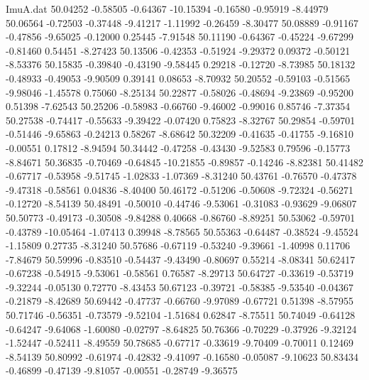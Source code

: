 \begin{filecontents}{ImuA.dat}
  50.04252   -0.58505   -0.64367  -10.15394   -0.16580   -0.95919   -8.44979
  50.06564   -0.72503   -0.37448   -9.41217   -1.11992   -0.26459   -8.30477
  50.08889   -0.91167   -0.47856   -9.65025   -0.12000    0.25445   -7.91548
  50.11190   -0.64367   -0.45224   -9.67299   -0.81460    0.54451   -8.27423
  50.13506   -0.42353   -0.51924   -9.29372    0.09372   -0.50121   -8.53376
  50.15835   -0.39840   -0.43190   -9.58445    0.29218   -0.12720   -8.73985
  50.18132   -0.48933   -0.49053   -9.90509    0.39141    0.08653   -8.70932
  50.20552   -0.59103   -0.51565   -9.98046   -1.45578    0.75060   -8.25134
  50.22877   -0.58026   -0.48694   -9.23869   -0.95200    0.51398   -7.62543
  50.25206   -0.58983   -0.66760   -9.46002   -0.99016    0.85746   -7.37354
  50.27538   -0.74417   -0.55633   -9.39422   -0.07420    0.75823   -8.32767
  50.29854   -0.59701   -0.51446   -9.65863   -0.24213    0.58267   -8.68642
  50.32209   -0.41635   -0.41755   -9.16810   -0.00551    0.17812   -8.94594
  50.34442   -0.47258   -0.43430   -9.52583    0.79596   -0.15773   -8.84671
  50.36835   -0.70469   -0.64845  -10.21855   -0.89857   -0.14246   -8.82381
  50.41482   -0.67717   -0.53958   -9.51745   -1.02833   -1.07369   -8.31240
  50.43761   -0.76570   -0.47378   -9.47318   -0.58561    0.04836   -8.40400
  50.46172   -0.51206   -0.50608   -9.72324   -0.56271   -0.12720   -8.54139
  50.48491   -0.50010   -0.44746   -9.53061   -0.31083   -0.93629   -9.06807
  50.50773   -0.49173   -0.30508   -9.84288    0.40668   -0.86760   -8.89251
  50.53062   -0.59701   -0.43789  -10.05464   -1.07413    0.39948   -8.78565
  50.55363   -0.64487   -0.38524   -9.45524   -1.15809    0.27735   -8.31240
  50.57686   -0.67119   -0.53240   -9.39661   -1.40998    0.11706   -7.84679
  50.59996   -0.83510   -0.54437   -9.43490   -0.80697    0.55214   -8.08341
  50.62417   -0.67238   -0.54915   -9.53061   -0.58561    0.76587   -8.29713
  50.64727   -0.33619   -0.53719   -9.32244   -0.05130    0.72770   -8.43453
  50.67123   -0.39721   -0.58385   -9.53540   -0.04367   -0.21879   -8.42689
  50.69442   -0.47737   -0.66760   -9.97089   -0.67721    0.51398   -8.57955
  50.71746   -0.56351   -0.73579   -9.52104   -1.51684    0.62847   -8.75511
  50.74049   -0.64128   -0.64247   -9.64068   -1.60080   -0.02797   -8.64825
  50.76366   -0.70229   -0.37926   -9.32124   -1.52447   -0.52411   -8.49559
  50.78685   -0.67717   -0.33619   -9.70409   -0.70011    0.12469   -8.54139
  50.80992   -0.61974   -0.42832   -9.41097   -0.16580   -0.05087   -9.10623
  50.83434   -0.46899   -0.47139   -9.81057   -0.00551   -0.28749   -9.36575

\end{filecontents}
